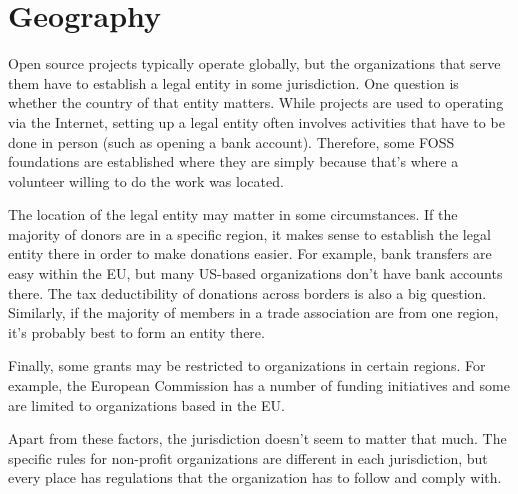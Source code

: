 


\chapter{Geography}

Open source projects typically operate globally, but the organizations that serve them have to establish a legal entity in some jurisdiction.  One question is whether the country of that entity matters.  While projects are used to operating via the Internet, setting up a legal entity often involves activities that have to be done in person (such as opening a bank account).  Therefore, some FOSS foundations are established where they are simply because that's where a volunteer willing to do the work was located.

The location of the legal entity may matter in some circumstances.  If the majority of donors are in a specific region, it makes sense to establish the legal entity there in order to make donations easier.  For example, bank transfers are easy within the EU, but many US-based organizations don't have bank accounts there.  The tax deductibility of donations across borders is also a big question.  Similarly, if the majority of members in a trade association are from one region, it's probably best to form an entity there.

Finally, some grants may be restricted to organizations in certain regions.  For example, the European Commission has a number of funding initiatives and some are limited to organizations based in the EU.

Apart from these factors, the jurisdiction doesn't seem to matter that much.  The specific rules for non-profit organizations are different in each jurisdiction, but every place has regulations that the organization has to follow and comply with.

\newpage

